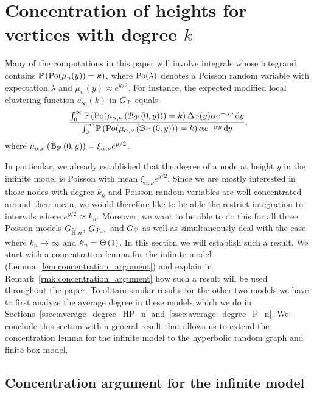 \section{Concentration of heights for vertices with degree $k$}\label{sec:concentration_argument}

Many of the computations in this paper will involve integrals whose integrand contains $\mathbb{P}\left({\mathrm{Po}}(\mu_n(y)) = k\right)$, where ${\mathrm{Po}}(\lambda)$ denotes a Poisson random variable with expectation $\lambda$ and $\mu_n(y) \approx e^{y/2}$. For instance, the expected modified local clustering function $c_\infty(k)$ in $G_{{\mathcal P}}$ equals
\[
	\frac{\int_0^\infty \mathbb{P}\left({\mathrm{Po}}(\mu_{\alpha,\nu}\left({\mathcal B}_{{\mathcal P}}\left(0,y\right)\right)) = k\right) \Delta_{{\mathcal P}}(y) \alpha e^{-\alpha y} \operatorname{\mathrm{d}\hspace{-2pt}} y}
	{\int_0^\infty \mathbb{P}\left({\mathrm{Po}}(\mu_{\alpha,\nu}\left({\mathcal B}_{{\mathcal P}}\left(0,y\right)\right)) = k\right) \alpha e^{-\alpha y} \operatorname{\mathrm{d}\hspace{-2pt}} y},
\]
where $\mu_{\alpha,\nu}\left({\mathcal B}_{{\mathcal P}}\left(0,y\right)\right) = \xi_{\alpha,\nu} e^{y/2}$. 

In particular, we already established that the degree of a node at height $y$ in the infinite model is Poisson with mean $\xi_{\alpha,\nu} e^{y/2}$. Since we are mostly interested in those nodes with degree $k_n$ and Poisson random variables are well concentrated around their mean, we would therefore like to be able the restrict integration to intervals where $e^{y/2} \approx k_n$. Moreover, we want to be able to do this for all three Poisson models $G_{\widetilde{\mathbb{H}},n}$, $G_{{\mathcal P},n}$ and $G_{{\mathcal P}}$ as well as simultaneously deal with the case where $k_n \to \infty$ and $k_n = \Theta\left(1\right)$. In this section we will establish such a result. We start with a concentration lemma for the infinite model (Lemma~\ref{lem:concentration_argument}) and explain in Remark~\ref{rmk:concentration_argument} how such a result will be used throughout the paper. To obtain similar results for the other two models we have to first analyze the average degree in these models which we do in Sections~\ref{ssec:average_degree_HP_n} and~\ref{ssec:average_degree_P_n}. We conclude this section with a general result that allows us to extend the concentration lemma for the infinite model to the hyperbolic random graph and finite box model. 

\subsection{Concentration argument for the infinite model}

